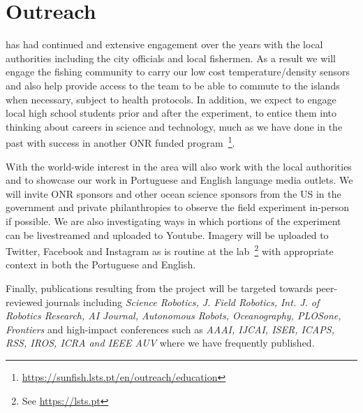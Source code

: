 \section{Outreach}

\univ has had continued and extensive engagement over the years with the
local authorities including the \naz city officials and local fishermen.
As a result we will engage the fishing community to carry our low cost
temperature/density sensors and also help provide access to the team to
be able to commute to the islands when necessary, subject to health
protocols. In addition, we expect to engage local high school students
prior and after the experiment, to entice them into thinking about
careers in science and technology, much as we have done in the past with
success in another ONR funded
program~\footnote{\url{https://sunfish.lsts.pt/en/outreach/education}}.

With the world-wide interest in the area \proj will also work with the
local authorities and \univ to showcase our work in Portuguese and
English language media outlets. We will invite ONR sponsors and other
ocean science sponsors from the US in the government and private
philanthropies to observe the field experiment in-person if possible. We
are also investigating ways in which portions of the experiment can be
livestreamed and uploaded to Youtube. Imagery will be uploaded to
Twitter, Facebook and Instagram as is routine at the \ls
lab~\footnote{See \url{https://lsts.pt}} with appropriate context in
both the Portuguese and English.

Finally, publications resulting from the project will be targeted
towards peer-reviewed journals including \emph{Science Robotics,
  J. Field Robotics, Int. J. of Robotics Research, AI Journal,
  Autonomous Robots, Oceanography, PLOSone, Frontiers} and high-impact
conferences such as \emph{AAAI, IJCAI, ISER, ICAPS, RSS, IROS, ICRA
  and IEEE AUV} where we have frequently published.

